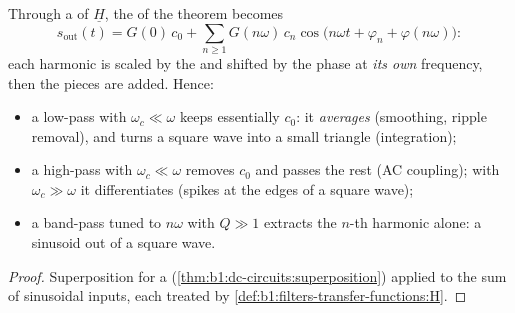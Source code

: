 \begin{proposition}\label{prop:b1:filters-transfer-functions:filtering}
Through a  of  $\underline H$, the  of the
theorem becomes
\[
s_{\text{out}}(t) = G(0)\,c_0 + \sum_{n \geq 1} G(n\omega)\,c_n\cos\!\big(n\omega t + \varphi_n + \varphi(n\omega)\big):
\]
each harmonic is scaled by the  and shifted by the phase at
\emph{its own} frequency, then the pieces are added. Hence:
\begin{itemize}
  \item a low-pass with $\omega_c \ll \omega$ keeps essentially $c_0$:
        it \emph{averages} (smoothing, ripple removal), and turns a
        square wave into a small triangle (integration);
  \item a high-pass with $\omega_c \ll \omega$ removes $c_0$ and passes
        the rest (AC coupling); with $\omega_c \gg \omega$ it
        differentiates (spikes at the edges of a square wave);
  \item a band-pass tuned to $n\omega$ with $Q \gg 1$ extracts the
        $n$-th harmonic alone: a sinusoid out of a square wave.
\end{itemize}
\end{proposition}

\begin{proof}
Superposition for a  (\cref{thm:b1:dc-circuits:superposition})
applied to the sum of sinusoidal inputs, each treated by
\cref{def:b1:filters-transfer-functions:H}.
\end{proof}

